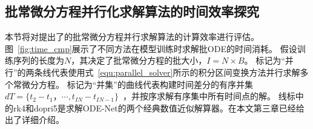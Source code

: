 \subsection{批常微分方程并行化求解算法的时间效率探究}
\label{sec:5_parallel_experiment}
本节将对提出了的批常微分方程并行求解算法的计算效率进行评估。
图~\ref{fig:time_cmp}展示了不同方法在模型训练时求解批ODE的时间消耗。
假设训练序列的长度为$N$，其决定了批常微分方程的批大小，$I=N\times B$。
标记为“并行”的两条线代表使用式~\eqref{equ:parallel_solver}所示的积分区间变换方法并行求解多个常微分方程。
标记为“并集”的曲线代表构建时间差分的有序并集$dT=\{t_2-t_1，\cdots, t_{IN}-t_{IN-1}\}$~\cite{yildiz2021continuous,Rubanova2019}，并按序求解有序集中所有时间点的解。
线标中的rk4和dopri5是求解ODE-Net的两个经典数值近似解算器\cite{chen2018neuralode,Yuan2022}。在本文第三章已经给出了详细介绍。


